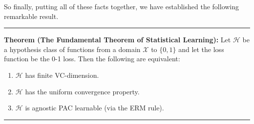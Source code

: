 \documentclass[]{article}
\begin{document}
So finally, putting all of these facts together, we have established the
following remarkable result.

\begin{center}\rule{0.5\linewidth}{\linethickness}\end{center}

\textbf{Theorem (The Fundamental Theorem of Statistical Learning):} Let
\(\mathcal{H}\) be a hypothesis class of functions from a domain
\(\mathcal{X}\) to \(\{0, 1\}\) and let the loss function be the 0-1
loss. Then the following are equivalent:

\begin{enumerate}
\def\labelenumi{\arabic{enumi}.}
\item
  \(\mathcal{H}\) has finite VC-dimension.
\item
  \(\mathcal{H}\) has the uniform convergence property.
\item
  \(\mathcal{H}\) is agnostic PAC learnable (via the ERM rule).
\end{enumerate}

\begin{center}\rule{0.5\linewidth}{\linethickness}\end{center}
\end{document}
